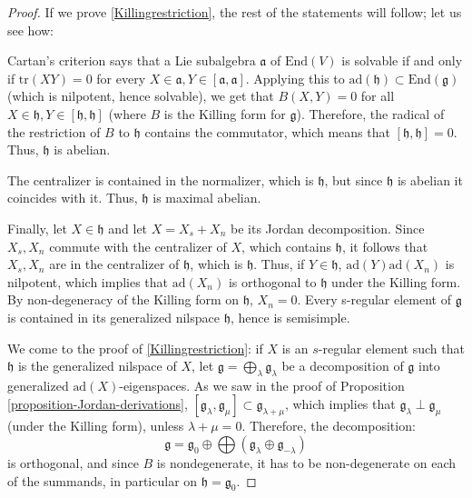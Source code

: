 \begin{proof}
If we prove \eqref{Killingrestriction}, the rest of the statements will follow; let us see how: 

Cartan's criterion says that a Lie subalgebra $\mathfrak a$ of $\text{End}(V)$ is solvable if and only if $\text{tr}(XY)=0$ for every $X\in \mathfrak a, Y\in [\mathfrak a,\mathfrak a]$. Applying this to $\text{ad}(\mathfrak h)\subset \text{End}(\mathfrak g)$ (which is nilpotent, hence solvable), we get that $B(X,Y)=0$ for all $X\in \mathfrak h, Y\in[\mathfrak h,\mathfrak h]$ (where $B$ is the Killing form for $\mathfrak g$). Therefore, the radical of the restriction of $B$ to $\mathfrak h$ contains the commutator, which means that $[\mathfrak h,\mathfrak h]=0$. Thus, $\mathfrak h$ is abelian.

The centralizer is contained in the normalizer, which is $\mathfrak h$, but since $\mathfrak h$ is abelian it coincides with it. Thus, $\mathfrak h$ is maximal abelian.

Finally, let $X\in\mathfrak h$ and let $X=X_s+X_n$ be its Jordan decomposition. Since $X_s, X_n$ commute with the centralizer of $X$, which contains $\mathfrak h$, it follows that $X_s, X_n$ are in the centralizer of $\mathfrak h$, which is $\mathfrak h$. Thus, if $Y\in\mathfrak h$, $\text{ad}(Y)\text{ad}(X_n)$ is nilpotent, which implies that $\text{ad}(X_n)$ is orthogonal to $\mathfrak h$ under the Killing form. By non-degeneracy of the Killing form on $\mathfrak h$, $X_n=0$. Every s-regular element of $\mathfrak g$ is contained in its generalized nilspace $\mathfrak h$, hence is semisimple.

We come to the proof of \eqref{Killingrestriction}: if $X$ is an $s$-regular element such that $\mathfrak h$ is the generalized nilspace of $X$, let $\mathfrak g = \bigoplus_\lambda \mathfrak g_\lambda$ be a decomposition of $\mathfrak g$ into generalized $\text{ad}(X)$-eigenspaces. As we saw in the proof of Proposition \ref{proposition-Jordan-derivations}, $[\mathfrak g_\lambda,\mathfrak g_\mu]\subset \mathfrak g_{\lambda+\mu}$, which implies that $\mathfrak g_\lambda \perp \mathfrak g_\mu$ (under the Killing form), unless $\lambda+\mu=0$. Therefore, the decomposition:
$$ \mathfrak g = \mathfrak g_0 \oplus \bigoplus (\mathfrak g_{\lambda}\oplus \mathfrak g_{-\lambda})$$
is orthogonal, and since $B$ is nondegenerate, it has to be non-degenerate on each of the summands, in particular on $\mathfrak h=\mathfrak g_0$.
\end{proof}


